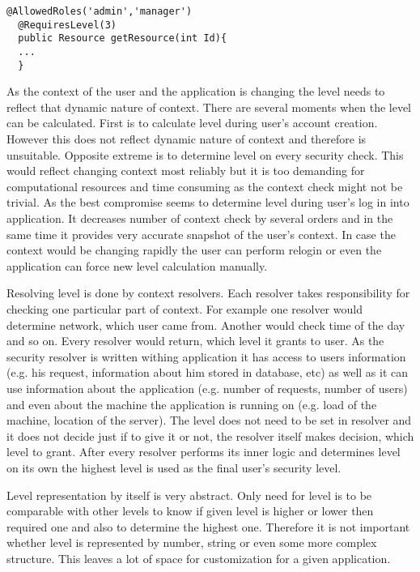 \documentclass{poster15}
\begin{document}
\begin{lstlisting}[frame=single]
  @AllowedRoles('admin','manager')
  @RequiresLevel(3)
  public Resource getResource(int Id){
  ...
  }
\end{lstlisting}


As the context of the user and the application is changing the level needs to reflect that dynamic nature of context. There are several moments when the level can be calculated. First is to calculate level during user's account creation. However this does not reflect dynamic nature of context and therefore is unsuitable. Opposite extreme is to determine level on every security check. This would reflect changing context most reliably but it is too demanding for computational resources and time consuming as the context check might not be trivial. As the best compromise seems to determine level during user's log in into application. It decreases number of context check by several orders and in the same time it provides very accurate snapshot of the user's context. In case the context would be changing rapidly the user can perform relogin or even the application can force new level calculation manually.

Resolving level is done by context resolvers. Each resolver takes responsibility for checking one particular part of context. For example one resolver would determine network, which user came from. Another would check time of the day and so on. Every resolver would return, which level it grants to user. As the security resolver is written withing application it has access to users information (e.g. his request, information about him stored in database, etc) as well as it can use information about the application (e.g. number of requests, number of users) and even about the machine the application is running on (e.g. load of the machine, location of the server). The level does not need to be set in resolver and it does not decide just if to give it or not, the resolver itself makes decision, which level to grant. After every resolver performs its inner logic and determines level on its own the highest level is used as the final user's security level.

Level representation by itself is very abstract. Only need for level is to be comparable with other levels to know if given level is higher or lower then required one and also to determine the highest one. Therefore it is not important whether level is represented by number, string or even some more complex structure. This leaves a lot of space for customization for a given application.
\end{document}
